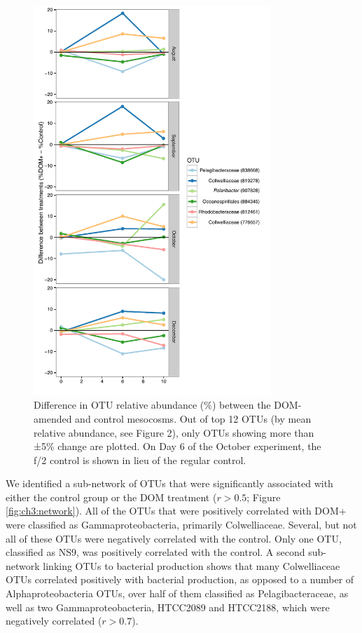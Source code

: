 \begin{figure}[htbp] 
\centering 
\includegraphics[width=0.8\textwidth]{Chapter_4_DOM/Figures/Figure_5_treatment_effect}
\caption[Difference in OTU relative abundance (\%) between the DOM-amended and control mesocosms.]{Difference in OTU relative abundance (\%) between the DOM-amended and control mesocosms. Out of top 12 OTUs (by mean relative abundance, see Figure 2), only OTUs showing more than ±5\% change are plotted. On Day 6 of the October experiment, the f/2 control is shown in lieu of the regular control.} 
\label{fig:ch3:treatment_effect} 
\end{figure}

We identified a sub-network of OTUs that were significantly associated with either the control group or the DOM treatment ($r > 0.5$; Figure \ref{fig:ch3:network}). All of the OTUs that were positively correlated with DOM+ were classified as Gammaproteobacteria, primarily Colwelliaceae. Several, but not all of these OTUs were negatively correlated with the control. Only one OTU, classified as NS9, was positively correlated with the control. A second sub-network linking OTUs to bacterial production shows that many Colwelliaceae OTUs correlated positively with bacterial production, as opposed to a number of Alphaproteobacteria OTUs, over half of them classified as Pelagibacteraceae, as well as two Gammaproteobacteria, HTCC2089 and HTCC2188, which were negatively correlated ($r > 0.7$).

